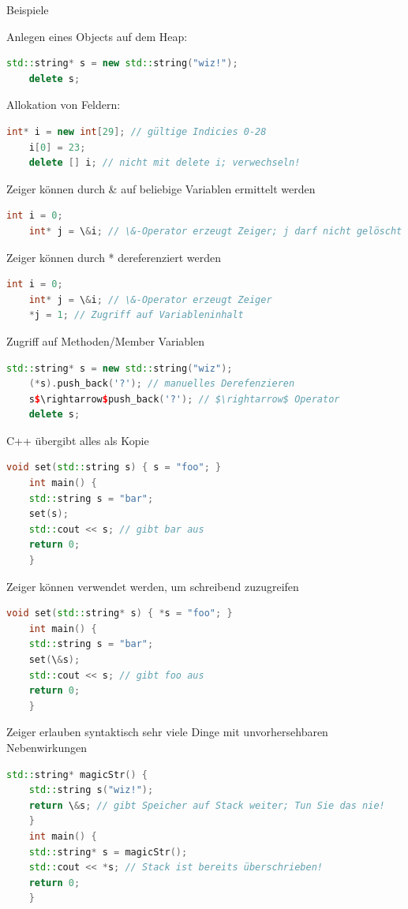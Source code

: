 \documentclass[10pt]{article}
\begin{document}
Beispiele
\begin{itemize*}
  \item Anlegen eines Objects auf dem Heap:
  \begin{lstlisting}[language=C++]
    std::string* s = new std::string("wiz!");
    delete s;
    \end{lstlisting}
  \item Allokation von Feldern:
  \begin{lstlisting}[language=C++]
    int* i = new int[29]; // gültige Indicies 0-28
    i[0] = 23;
    delete [] i; // nicht mit delete i; verwechseln!
    \end{lstlisting}
  \item Zeiger können durch \& auf beliebige Variablen ermittelt werden
  \begin{lstlisting}[language=C++]
    int i = 0;
    int* j = \&i; // \&-Operator erzeugt Zeiger; j darf nicht gelöscht werden
    \end{lstlisting}
  \item Zeiger können durch * dereferenziert werden
  \begin{lstlisting}[language=C++]
    int i = 0;
    int* j = \&i; // \&-Operator erzeugt Zeiger
    *j = 1; // Zugriff auf Variableninhalt
    \end{lstlisting}
  \item Zugriff auf Methoden/Member Variablen
  \begin{lstlisting}[language=C++]
    std::string* s = new std::string("wiz");
    (*s).push_back('?'); // manuelles Derefenzieren
    s$\rightarrow$push_back('?'); // $\rightarrow$ Operator
    delete s;
    \end{lstlisting}
  \item C++ übergibt alles als Kopie
  \begin{lstlisting}[language=C++]
    void set(std::string s) { s = "foo"; }
    int main() {
    std::string s = "bar";
    set(s);
    std::cout << s; // gibt bar aus
    return 0;
    }
    \end{lstlisting}
  \item Zeiger können verwendet werden, um schreibend zuzugreifen
  \begin{lstlisting}[language=C++]
    void set(std::string* s) { *s = "foo"; }
    int main() {
    std::string s = "bar";
    set(\&s);
    std::cout << s; // gibt foo aus
    return 0;
    }
    \end{lstlisting}
  \item Zeiger erlauben syntaktisch sehr viele Dinge mit unvorhersehbaren Nebenwirkungen
  \begin{lstlisting}[language=C++]
    std::string* magicStr() {
    std::string s("wiz!");
    return \&s; // gibt Speicher auf Stack weiter; Tun Sie das nie!
    }
    int main() {
    std::string* s = magicStr();
    std::cout << *s; // Stack ist bereits überschrieben!
    return 0;
    }
    \end{lstlisting}
\end{itemize*}
\end{document}
